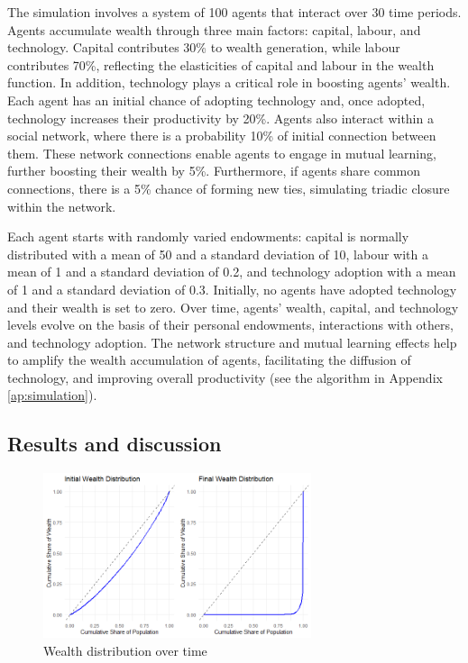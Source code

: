 \documentclass[12pt]{article}
\begin{document}
The simulation involves a system of 100 agents that interact over 30 time periods. Agents accumulate wealth through three main factors: capital, labour, and technology. Capital contributes 30\% to wealth generation, while labour contributes 70\%, reflecting the elasticities of capital and labour in the wealth function. In addition, technology plays a critical role in boosting agents' wealth. Each agent has an initial chance of adopting technology and, once adopted, technology increases their productivity by 20\%. Agents also interact within a social network, where there is a probability 10\% of initial connection between them. These network connections enable agents to engage in mutual learning, further boosting their wealth by 5\%. Furthermore, if agents share common connections, there is a 5\% chance of forming new ties, simulating triadic closure within the network.

Each agent starts with randomly varied endowments: capital is normally distributed with a mean of 50 and a standard deviation of 10, labour with a mean of 1 and a standard deviation of 0.2, and technology adoption with a mean of 1 and a standard deviation of 0.3. Initially, no agents have adopted technology and their wealth is set to zero. Over time, agents' wealth, capital, and technology levels evolve on the basis of their personal endowments, interactions with others, and technology adoption. The network structure and mutual learning effects help to amplify the wealth accumulation of agents, facilitating the diffusion of technology, and improving overall productivity (see the algorithm in Appendix \ref{ap:simulation}).

\subsection{Results and discussion}
\begin{figure}[H]
    \centering
    \includegraphics[width=0.7\textwidth]{wealth_dist.png}
    \caption{Wealth distribution over time}
    \label{fig:wealth_dist}
\end{figure}
\end{document}
